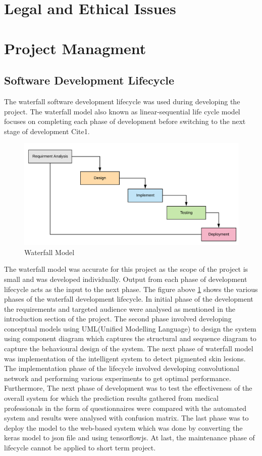 \section{Legal and Ethical Issues}

\pagebreak

\section{Project Managment}

\subsection{Software Development Lifecycle}
The waterfall software development lifecycle was used during developing the project. The waterfall
model also known as linear-sequential life cycle model focuses on completing each phase of
development before switching to the next stage of development Cite{1}. 
\begin{figure}[!htp]
    \centering
    \includegraphics[width=.8\textwidth]{Images/waterfall}
    \caption{Waterfall Model}
    \label{fig:waterfall}
\end{figure}
The waterfall model was accurate for this project as the scope of the project is small and was developed individually. Output
from each phase of development lifecycle acts as the input to the next phase. The figure above
\ref{fig:waterfall} shows the various phases of the waterfall development lifecycle. In initial phase of the
development the requirements and targeted audience were analysed as mentioned in the
introduction section of the project. The second phase involved developing conceptual models using
UML(Unified Modelling Language) to design the system using component diagram which captures
the structural and sequence diagram to capture the behavioural design of the system. The next
phase of waterfall model was implementation of the intelligent system to detect pigmented skin
lesions. The implementation phase of the lifecycle involved developing convolutional network and
performing various experiments to get optimal performance. Furthermore, The next phase of
development was to test the effectiveness of the overall system for which the prediction results
gathered from medical professionals in the form of questionnaires were compared with the
automated system and results were analysed with confusion matrix. The last phase was to deploy
the model to the web-based system which was done by converting the keras model to json file and
using tensorflowjs. At last, the maintenance phase of lifecycle cannot be applied to short term
project.

